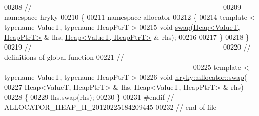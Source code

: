 \begin{DoxyCode}
00208 \textcolor{comment}{//
      ------------------------------------------------------------------------------}
00209 \textcolor{keyword}{namespace }hryky
00210 \{
00211 \textcolor{keyword}{namespace }allocator
00212 \{
00214     \textcolor{keyword}{template} < \textcolor{keyword}{typename} ValueT, \textcolor{keyword}{typename} HeapPtrT  >
00215     \textcolor{keywordtype}{void} \hyperlink{namespacehryky_a4282146df5ea2b68cb667896a2205909}{swap}(\hyperlink{classhryky_1_1allocator_1_1_heap}{Heap<ValueT, HeapPtrT>} & lhs, \hyperlink{classhryky_1_1allocator_1_1_heap}{Heap<ValueT, HeapPtrT>} & rhs);
00216 
00217 \}
00218 \}
00219 \textcolor{comment}{//
      ------------------------------------------------------------------------------}
00220 \textcolor{comment}{// definitions of global function}
00221 \textcolor{comment}{//
      ------------------------------------------------------------------------------}
00225 \textcolor{comment}{}\textcolor{keyword}{template} < \textcolor{keyword}{typename} ValueT, \textcolor{keyword}{typename} HeapPtrT  >
00226 \textcolor{keywordtype}{void} \hyperlink{namespacehryky_a4282146df5ea2b68cb667896a2205909}{hryky::allocator::swap}(
00227     Heap<ValueT, HeapPtrT> & lhs, Heap<ValueT, HeapPtrT> & rhs)
00228 \{
00229     lhs.swap(rhs);
00230 \}
00231 \textcolor{preprocessor}{#endif // ALLOCATOR\_HEAP\_H\_20120225184209445}
00232 \textcolor{preprocessor}{}\textcolor{comment}{// end of file}
\end{DoxyCode}
